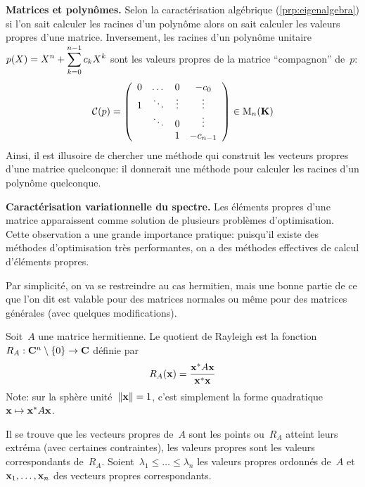 {\bf Matrices et polynômes.}
Selon la caractérisation algébrique (\ref{prp:eigenalgebra}) si l'on sait
calculer les racines d'un polynôme alors on sait calculer les valeurs propres
d'une matrice.  Inversement, les racines d'un polynôme unitaire~$\displaystyle
p(X)=X^n+\sum_{k=0}^{n-1} c_kX^k$ sont les valeurs propres de la matrice
``compagnon'' de~$p$:
\[
	\mathcal{C}(p)=
	\left(\begin{array}{cccc}
			0 & \dots & 0 & -c_0 \\
			1& \ddots &\vdots  & \vdots \\
			& \ddots & 0 & \vdots \\
			&  & 1 & -c_{{n-1}}
	\end{array}\right) \in\mathrm{M}_n(\mathbf{K})
\]
Ainsi, il est illusoire de chercher une méthode qui construit les vecteurs
propres d'une matrice quelconque: il donnerait une méthode pour calculer
les racines d'un polynôme quelconque.



{\bf Caractérisation variationnelle du spectre.}
Les éléments propres d'une matrice apparaissent comme solution de plusieurs
problèmes d'optimisation.  Cette observation a une grande importance
pratique: puisqu'il existe des méthodes d'optimisation très performantes,
on a des méthodes effectives de calcul d'éléments propres.

Par simplicité, on va se restreindre au cas hermitien, mais une bonne partie
de ce que l'on dit est valable pour des matrices normales ou même pour des
matrices générales (avec quelques modifications).

\begin{definition}
	Soit~$A$ une matrice hermitienne.  Le quotient de Rayleigh est la
	fonction~$R_A:\mathbf{C}^n\setminus\{0\}\to\mathbf{C}$ définie par
	\[
		R_A(\mathbf{x})=\frac{\mathbf{x}^*A\mathbf{x}}{\mathbf{x}^*\mathbf{x}}
	\]
	Note: sur la sphère unité~$\left\|\mathbf{x}\right\|=1$, c'est
	simplement la forme quadratique~$\mathbf{x}\mapsto\mathbf{x}^*A\mathbf{x}$.
\end{definition}

Il se trouve que les vecteurs propres de~$A$ sont les points ou~$R_A$
atteint leurs extréma (avec certaines contraintes), les valeurs propres sont
les valeurs correspondants de~$R_A$.  Soient~$\lambda_1\le\ldots\le\lambda_n$
les valeurs propres ordonnés de~$A$ et~$\mathbf{x}_1,\ldots,\mathbf{x}_n$ des vecteurs
propres correspondants.

